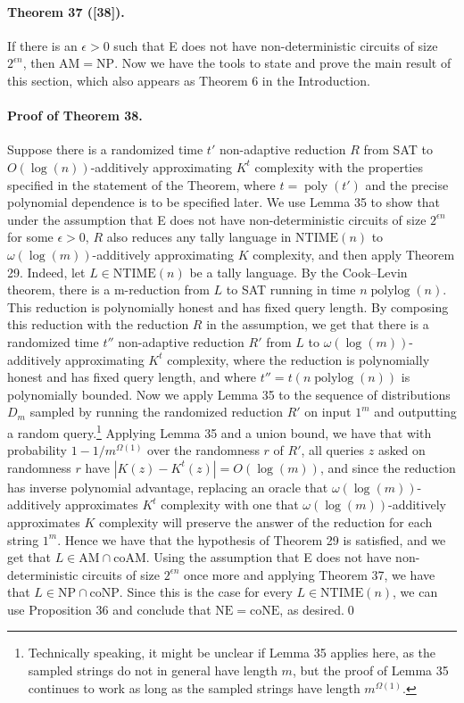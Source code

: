 \documentclass[10pt,a4paper]{article}
\begin{document}
\paragraph{Theorem 37 ([38]).} If there is an $\epsilon>0$ such that E does not have non-deterministic circuits of size $2^{\epsilon n}$, then $\mathrm{AM}=\mathrm{NP}$.
Now we have the tools to state and prove the main result of this section, which also appears as Theorem 6 in the Introduction.
\paragraph{Proof of Theorem 38.} Suppose there is a randomized time $t'$ non-adaptive reduction $R$ from SAT to $O(\log(n))$-additively approximating $K^t$ complexity with the properties specified in the statement of the Theorem, where $t=\operatorname{poly}(t')$ and the precise polynomial dependence is to be specified later. We use Lemma 35 to show that under the assumption that E does not have non-deterministic circuits of size $2^{\epsilon n}$ for some $\epsilon>0$, $R$ also reduces any tally language in $\mathrm{NTIME}(n)$ to $\omega(\log(m))$-additively approximating $K$ complexity, and then apply Theorem 29.
Indeed, let $L\in\mathrm{NTIME}(n)$ be a tally language. By the Cook--Levin theorem, there is a m-reduction from $L$ to SAT running in time $n\operatorname{polylog}(n)$. This reduction is polynomially honest and has fixed query length. By composing this reduction with the reduction $R$ in the assumption, we get that there is a randomized time $t''$ non-adaptive reduction $R'$ from $L$ to $\omega(\log(m))$-additively approximating $K^t$ complexity, where the reduction is polynomially honest and has fixed query length, and where $t''=t(n\operatorname{polylog}(n))$ is polynomially bounded.
Now we apply Lemma 35 to the sequence of distributions $D_m$ sampled by running the randomized reduction $R'$ on input $1^m$ and outputting a random query.\footnote{Technically speaking, it might be unclear if Lemma 35 applies here, as the sampled strings do not in general have length $m$, but the proof of Lemma 35 continues to work as long as the sampled strings have length $m^{\Omega(1)}$.} Applying Lemma 35 and a union bound, we have that with probability $1-1/m^{\Omega(1)}$ over the randomness $r$ of $R'$, all queries $z$ asked on randomness $r$ have $|K(z)-K^t(z)|=O(\log(m))$, and since the reduction has inverse polynomial advantage, replacing an oracle that $\omega(\log(m))$-additively approximates $K^t$ complexity with one that $\omega(\log(m))$-additively approximates $K$ complexity will preserve the answer of the reduction for each string $1^m$. Hence we have that the hypothesis of Theorem 29 is satisfied, and we get that $L\in\mathrm{AM}\cap\mathrm{coAM}$.
Using the assumption that E does not have non-deterministic circuits of size $2^{\epsilon n}$ once more and applying Theorem 37, we have that $L\in\mathrm{NP}\cap\mathrm{coNP}$. Since this is the case for every $L\in\mathrm{NTIME}(n)$, we can use Proposition 36 and conclude that $\mathrm{NE}=\mathrm{coNE}$, as desired.\qed
\end{document}

